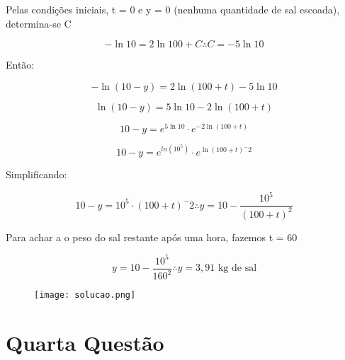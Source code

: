 \documentclass{beamer}
\begin{document}
	\begin{frame}
		Pelas condições iniciais, t = 0 e y = 0 (nenhuma quantidade de sal escoada), determina-se C
		
		\begin{displaymath}
			-\ln 10 = 2 \ln 100 + C \therefore C = -5 \ln 10
		\end{displaymath} \pause
		
		Então:
		
		\begin{displaymath}
			-\ln(10 - y) = 2\ln(100 + t) - 5\ln 10
		\end{displaymath}\pause
		
		\begin{displaymath}
			\ln(10 - y) = 5\ln 10 - 2\ln(100 + t)
		\end{displaymath} \pause	
		
		\begin{displaymath}
		10 - y = e^{5\ln10} \cdot e^{-2\ln(100 + t)}
		\end{displaymath} \pause
		
		\begin{displaymath}
		10 - y = e^{ln(10^5)} \cdot e^{\ln(100 + t)^-2}
		\end{displaymath}
	\end{frame}
	
	\begin{frame}
		Simplificando:
		
		\begin{displaymath}
			10 - y = 10^5 \cdot (100 + t)^-2 \therefore \boxed{ y = 10 - \frac{10^5}{(100 + t)^2} }
		\end{displaymath}
		
		Para achar a o peso do sal restante após uma hora, fazemos t = 60
		
		\begin{displaymath}
			y = 10 - \frac{10^5}{160^2} \therefore \boxed{ y = 3,91 \text{ kg de sal} }
		\end{displaymath}
		
		\begin{figure}
			\centering
			\texttt{[image: solucao.png]}
			\label{}
		\end{figure}
		
		
	\end{frame}


	\section{Quarta Questão}
\end{document}
